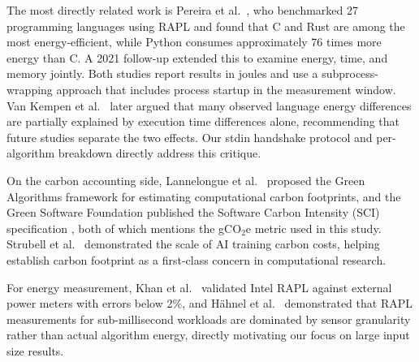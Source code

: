 The most directly related work is Pereira et al.\ \cite{10.1145/3136014.3136031}, who benchmarked 27 programming languages using RAPL and found that C and Rust are among the most energy-efficient, while Python consumes approximately 76 times more energy than C. A 2021 follow-up \cite{PEREIRA2021102609} extended this to examine energy, time, and memory jointly. Both studies report results in joules and use a subprocess-wrapping approach that includes process startup in the measurement window. Van Kempen et al.\ \cite{11334459} later argued that many observed language energy differences are partially explained by execution time differences alone, recommending that future studies separate the two effects. Our stdin handshake protocol and per-algorithm breakdown directly address this critique.

On the carbon accounting side, Lannelongue et al.\ \cite{lannelongue2021} proposed the Green Algorithms framework for estimating computational carbon footprints, and the Green Software Foundation published the Software Carbon Intensity (SCI) specification \cite{grnsoftware2023}, both of which mentions the gCO$_2$e metric used in this study. Strubell et al.\ \cite{strubell-etal-2019-energy} demonstrated the scale of AI training carbon costs, helping establish carbon footprint as a first-class concern in computational research.

For energy measurement, Khan et al.\ \cite{10.1145/3177754} validated Intel RAPL against external power meters with errors below 2\%, and Hähnel et al.\ \cite{10.1145/2425248.2425252} demonstrated that RAPL measurements for sub-millisecond workloads are dominated by sensor granularity rather than actual algorithm energy, directly motivating our focus on large input size results.